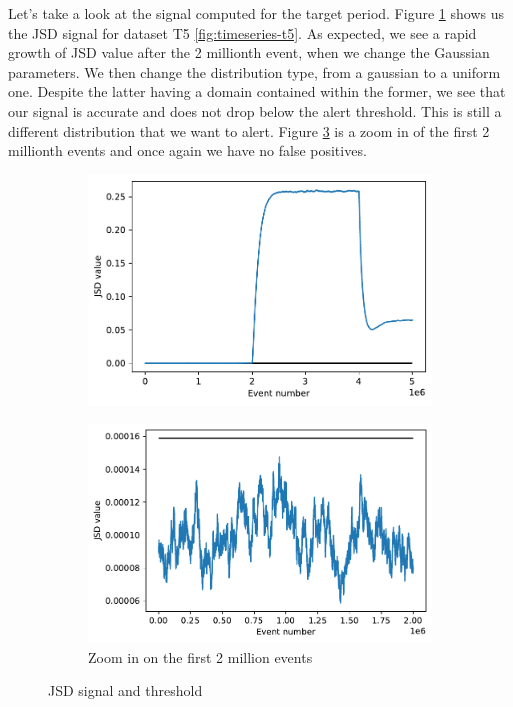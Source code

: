 Let's take a look at the signal computed for the target period. Figure \ref{fig:JSD-signal-test05} shows us the JSD signal for dataset T5 \ref{fig:timeseries-t5}. As expected, we see a rapid growth of JSD value after the 2 millionth event, when we change the Gaussian parameters. We then change the distribution type, from a gaussian to a uniform one. Despite the latter having a domain contained within the former, we see that our signal is accurate and does not drop below the alert threshold. This is still a different distribution that we want to alert. Figure \ref{fig:JSD-signal-zoom-test05} is a zoom in of the first 2 millionth events and once again we have no false positives.
\begin{figure}[!htb]
\centering
\begin{subfigure}{.5\textwidth}
  \centering
  \includegraphics[width=1\linewidth]{figures/stream-analysis-viz-test05.pdf}
  \label{fig:JSD-signal-test05}
\end{subfigure}%
\begin{subfigure}{.5\textwidth}
  \centering
  \includegraphics[width=1\linewidth]{figures/stream-analysis-viz-zoom-test05.pdf}
  \caption{Zoom in on the first 2 million events}
  \label{fig:JSD-signal-zoom-test05}
\end{subfigure}
\caption{JSD signal and threshold}
\end{figure}

